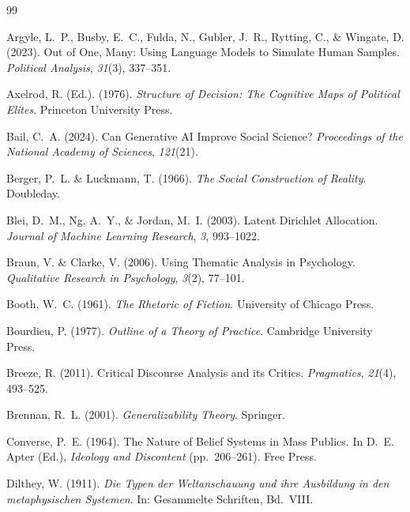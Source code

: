 \documentclass[11pt,a4paper]{article}
\theoremstyle{definition}
\theoremstyle{plain}
\theoremstyle{remark}
\begin{document}
\begin{thebibliography}{99}

  Argyle, L.~P., Busby, E.~C., Fulda, N., Gubler, J.~R., Rytting, C., \& Wingate, D. (2023).
  Out of One, Many: Using Language Models to Simulate Human Samples.
  \textit{Political Analysis}, \textit{31}(3), 337--351.

  Axelrod, R. (Ed.). (1976).
  \textit{Structure of Decision: The Cognitive Maps of Political Elites}.
  Princeton University Press.

  Bail, C.~A. (2024).
  Can Generative AI Improve Social Science?
  \textit{Proceedings of the National Academy of Sciences}, \textit{121}(21).

  Berger, P.~L. \& Luckmann, T. (1966).
  \textit{The Social Construction of Reality}.
  Doubleday.

  Blei, D.~M., Ng, A.~Y., \& Jordan, M.~I. (2003).
  Latent Dirichlet Allocation.
  \textit{Journal of Machine Learning Research}, \textit{3}, 993--1022.

  Braun, V. \& Clarke, V. (2006).
  Using Thematic Analysis in Psychology.
  \textit{Qualitative Research in Psychology}, \textit{3}(2), 77--101.

  Booth, W.~C. (1961).
  \textit{The Rhetoric of Fiction}.
  University of Chicago Press.

  Bourdieu, P. (1977).
  \textit{Outline of a Theory of Practice}.
  Cambridge University Press.

  Breeze, R. (2011).
  Critical Discourse Analysis and its Critics.
  \textit{Pragmatics}, \textit{21}(4), 493--525.

  Brennan, R.~L. (2001).
  \textit{Generalizability Theory}.
  Springer.

  Converse, P.~E. (1964).
  The Nature of Belief Systems in Mass Publics.
  In D.~E. Apter (Ed.), \textit{Ideology and Discontent} (pp.~206--261).
  Free Press.

  Dilthey, W. (1911).
  \textit{Die Typen der Weltanschauung und ihre Ausbildung in den metaphysischen Systemen}.
  In: Gesammelte Schriften, Bd.~VIII.


\end{thebibliography}
\end{document}
